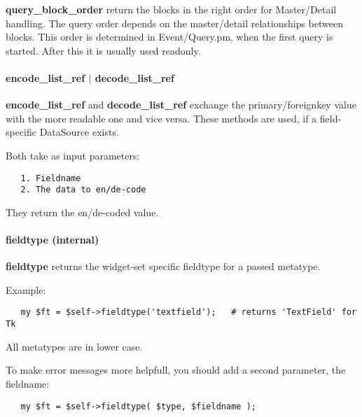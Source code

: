 \textbf{query\_block\_order} return the blocks in the right order for Master/Detail
handling. The query order depends on the master/detail relationships between
blocks. This order is determined in Event/Query.pm, when the first query is
started. After this it is usually used readonly.

\paragraph*{encode\_list\_ref $|$ decode\_list\_ref\label{Apiis::Form::Init_--_base_package_for_Form_objects_of_all_types_encode_list_ref_decode_list_ref}}


\textbf{encode\_list\_ref} and \textbf{decode\_list\_ref} exchange the primary/foreignkey
value with the more readable one and vice versa. These methods are used, if a
field-specific DataSource exists.



Both take as input parameters:

\begin{verbatim}
   1. Fieldname
   2. The data to en/de-code
\end{verbatim}


They return the en/de-coded value.

\paragraph*{fieldtype (internal)\label{Apiis::Form::Init_--_base_package_for_Form_objects_of_all_types_fieldtype_internal_}}


\textbf{fieldtype} returns the widget-set specific fieldtype for a passed metatype.



Example:

\begin{verbatim}
   my $ft = $self->fieldtype('textfield');   # returns 'TextField' for Tk
\end{verbatim}


All metatypes are in lower case.



To make error messages more helpfull, you should add a second parameter,
the fieldname:

\begin{verbatim}
   my $ft = $self->fieldtype( $type, $fieldname );
\end{verbatim}


